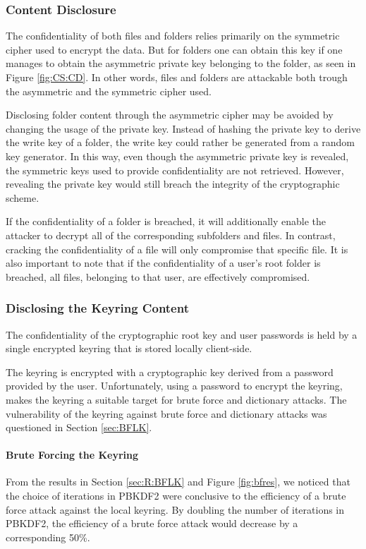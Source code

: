 \documentclass[pdftex,english,10pt,b5paper,twoside]{book}
\begin{document}
\subsubsection{Content Disclosure}

The confidentiality of both files and folders relies primarily on the symmetric
cipher used to encrypt the data. But for folders one can obtain this key if one
manages to obtain the asymmetric private key belonging to the folder, as seen
in Figure \ref{fig:CS:CD}. In other words, files and folders are attackable
both trough the asymmetric and the symmetric cipher used.

Disclosing folder content through the asymmetric cipher may be avoided by
changing the usage of the private key. Instead of hashing the private key to
derive the write key of a folder, the write key could rather be generated from
a random key generator. In this way, even though the asymmetric private key is
revealed, the symmetric keys used to provide confidentiality are not retrieved.
However, revealing the private key would still breach the integrity of the
cryptographic scheme.

If the confidentiality of a folder is breached, it will additionally enable the
attacker to decrypt all of the corresponding subfolders and files. In
contrast, cracking the confidentiality of a file will only compromise that
specific file. It is also important to note that if the confidentiality of a
user's root folder is breached, all files, belonging to that user, are
effectively compromised.

\subsubsection{Disclosing the Keyring Content}

The confidentiality of the cryptographic root key and user passwords is held by
a single encrypted keyring that is stored locally client-side.

The keyring is encrypted with a cryptographic key derived from a password
provided by the user. Unfortunately, using a password to encrypt the keyring,
makes the keyring a suitable target for brute force and dictionary attacks. The
vulnerability of the keyring against brute force and dictionary attacks was
questioned in Section \ref{sec:BFLK}.

\paragraph{Brute Forcing the Keyring} From the results in Section
\ref{sec:R:BFLK} and Figure \ref{fig:bfres}, we noticed that the choice of
iterations in \ac{PBKDF2} were conclusive to the efficiency of a brute force
attack against the local keyring. By doubling the number of iterations in
\ac{PBKDF2}, the efficiency of a brute force attack would decrease by a
corresponding 50\%.
\end{document}
